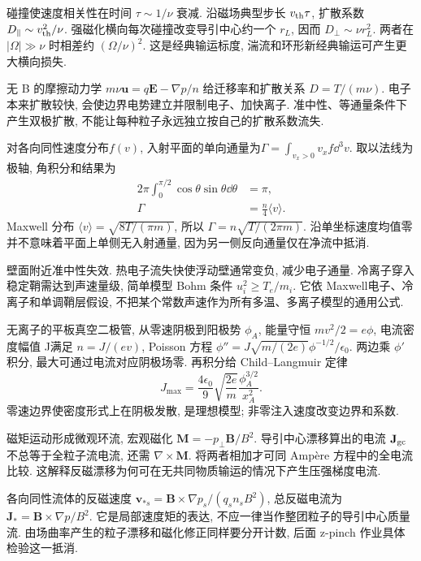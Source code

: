 \label{ch:transport}
碰撞使速度相关性在时间 $\tau\sim1/\nu$ 衰减. 沿磁场典型步长 $v_{\rm th}\tau$, 扩散系数 $D_\parallel\sim v_{\rm th}^2/\nu$. 强磁化横向每次碰撞改变导引中心约一个 $r_L$, 因而 $D_\perp\sim\nu r_L^2$. 两者在 $|\Omega|\gg\nu$ 时相差约 $(\Omega/\nu)^2$. 这是经典输运标度, 湍流和环形新经典输运可产生更大横向损失.

无 B 的摩擦动力学 $m\nu\mathbf u=q\mathbf E-\nabla p/n$ 给迁移率和扩散关系 $D=T/(m\nu)$. 电子本来扩散较快, 会使边界电势建立并限制电子、加快离子. 准中性、等通量条件下产生双极扩散, 不能让每种粒子永远独立按自己的扩散系数流失.

对各向同性速度分布$f(v)$, 入射平面的单向通量为$\Gamma=\int_{v_x>0}v_xf\dd^3v$. 取以法线为极轴, 角积分和结果为
\begin{align}
 2\pi\int_0^{\pi/2}\cos\theta\sin\theta\dd\theta&=\pi,\\
 \Gamma&=\frac n4\langle v\rangle.
\end{align}
Maxwell 分布 $\langle v\rangle=\sqrt{8T/(\pi m)}$, 所以 $\Gamma=n\sqrt{T/(2\pi m)}$. 沿单坐标速度均值零并不意味着平面上单侧无入射通量, 因为另一侧反向通量仅在净流中抵消.

壁面附近准中性失效. 热电子流失快使浮动壁通常变负, 减少电子通量. 冷离子穿入稳定鞘需达到声速量级, 简单模型 Bohm 条件 $u_i^2\ge T_e/m_i$. 它依 Maxwell电子、冷离子和单调鞘层假设, 不把某个常数声速作为所有多温、多离子模型的通用公式.

无离子的平板真空二极管, 从零速阴极到阳极势 $\phi_A$, 能量守恒 $mv^2/2=e\phi$, 电流密度幅值 J满足 $n=J/(ev)$, Poisson 方程 $\phi''=J\sqrt{m/(2e)}\phi^{-1/2}/\epsilon_0$. 两边乘 $\phi'$ 积分, 最大可通过电流对应阴极场零. 再积分给 Child--Langmuir 定律
\begin{equation}\label{eq:child}
 J_{\max}=\frac{4\epsilon_0}9\sqrt{\frac{2e}m}\frac{\phi_A^{3/2}}{x_A^2}.
\end{equation}
零速边界使密度形式上在阴极发散, 是理想模型; 非零注入速度改变边界和系数.

磁矩运动形成微观环流, 宏观磁化 $\mathbf M=-p_\perp\mathbf B/B^2$. 导引中心漂移算出的电流 $\mathbf J_{
\rm gc}$ 不总等于全粒子流电流, 还需 $\nabla\times\mathbf M$. 将两者相加才可同 Ampère 方程中的全电流比较. 这解释反磁漂移为何可在无共同物质输运的情况下产生压强梯度电流.

各向同性流体的反磁速度 $\mathbf v_{*s}=\mathbf B\times\nabla p_s/(q_sn_sB^2)$, 总反磁电流为 $\mathbf J_*=\mathbf B\times\nabla p/B^2$. 它是局部速度矩的表达, 不应一律当作整团粒子的导引中心质量流. 由场曲率产生的粒子漂移和磁化修正同样要分开计数, 后面 z-pinch 作业具体检验这一抵消.
